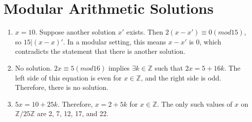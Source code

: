 \documentclass{article}
\begin{document}
\section{Modular Arithmetic Solutions}
\begin{enumerate}[label=(\alph*)]
    \item $x = 10$. Suppose another solution $x'$ exists. Then $2(x-x') \equiv 0 (mod 15)$, so $15|(x-x)'$. In a modular setting, this means $x-x'$ is 0, which contradicts the statement that there is another solution.
    \item No solution. $2x \equiv 5 (mod 16)$ implies $\exists k \in \mathbb{Z}$ such that $2x = 5 + 16k$. The left side of this equation is even for $x \in \mathbb{Z}$, and the right side is odd. Therefore, there is no solution.
    \item $5x = 10 + 25k$. Therefore, $x = 2+5k$ for $x \in \mathbb{Z}$. The only such values of $x$ on $\mathbb{Z}/25\mathbb{Z}$ are 2, 7, 12, 17, and 22.
\end{enumerate}
\end{document}
